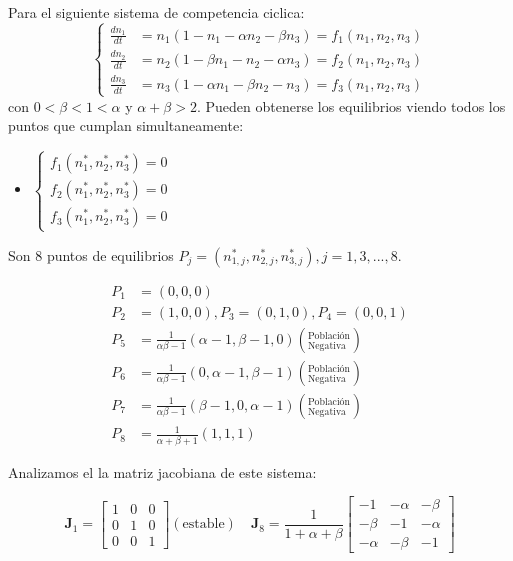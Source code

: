 \documentclass[twocolumn,aps,prl]{revtex4-1}
\newcommand{\nstar}{n^*}
\begin{document}
Para el siguiente sistema de competencia ciclica:
$$
\left\{
\begin{aligned}
\frac{d n_{1}}{d t}&=n_{1}\left(1-n_{1}-\alpha n_{2}-\beta n_{3}\right) = f_1(n_1,n_2,n_3)\\
\frac{d n_{2}}{d t}&=n_{2}\left(1-\beta n_{1}-n_{2}-\alpha n_{3}\right) = f_2(n_1,n_2,n_3) \\
\frac{d n_{3}}{d t}&=n_{3}\left(1-\alpha n_{1}-\beta n_{2}-n_{3}\right) = f_3(n_1,n_2,n_3)
\end{aligned}
\right.
$$
con $0<\beta<1<\alpha$ y $\alpha+\beta>2$. Pueden obtenerse los  equilibrios viendo todos los puntos que cumplan simultaneamente: 

\begin{itemize}\centering
    \item[] 
    $\left\lbrace
    \begin{aligned}
        f_1(\nstar_1,\nstar_2,\nstar_3) = 0\\ 
        f_2(\nstar_1,\nstar_2,\nstar_3) = 0\\ 
        f_3(\nstar_1,\nstar_2,\nstar_3) = 0   
    \end{aligned}\right.
    $
\end{itemize}


Son 8 puntos de equilibrios $P_j = (\nstar_{1,j},\nstar_{2,j},\nstar_{3,j}), j= 1, 3, ..., 8$.

$$
\begin{aligned}
    P_1 &= (0, 0, 0) \\ 
    P_2 &= (1, 0, 0), P_3 = (0, 1, 0), P_4 = (0, 0, 1) \\
    P_5 &= \frac{1}{\alpha \beta - 1} 
                       (\alpha - 1, \beta - 1 , 0)  \left(^\text{Población}_\text{Negativa} \right)  \\ 
    P_6 &= \frac{1}{\alpha \beta - 1} 
                       (0         , \alpha - 1, \beta - 1)  \left(^\text{Población}_\text{Negativa} \right)  \\ 
    P_7 &= \frac{1}{\alpha \beta - 1} 
                       (\beta - 1 , 0         , \alpha - 1)  \left(^\text{Población}_\text{Negativa} \right)  \\ 
    P_8 &= \frac{1}{\alpha + \beta + 1}(1, 1, 1) 
\end{aligned}
$$

Analizamos el la matriz jacobiana de este sistema:

$$
\mathbf{J}_1 = 
\begin{bmatrix}
    1  & 0 & 0 \\
    0 & 1 & 0 \\
    0 & 0 & 1
\end{bmatrix} (\text{estable})
\quad 
\mathbf{J}_8 = 
\frac{1}{1+\alpha+\beta}\begin{bmatrix}
    -1 & -\alpha & -\beta \\
    -\beta & -1 & -\alpha \\
    -\alpha & -\beta & -1
\end{bmatrix}
$$
\end{document}
